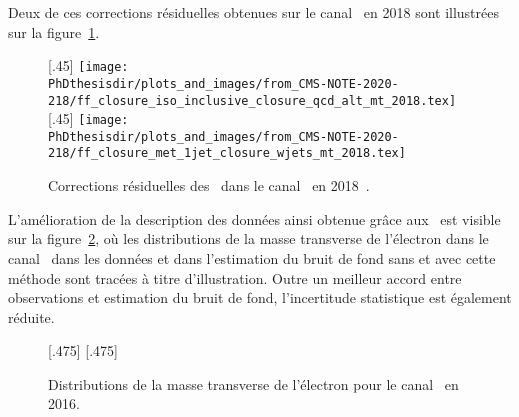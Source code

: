 Deux de ces corrections résiduelles obtenues sur le canal \mu\tauh\ en 2018 sont illustrées sur la figure~\ref{fig-chapter-HTT_analysis-section-bg_estimation-FF_method-closure}.
\begin{figure}[h]
\centering

[.45\textwidth]
{\texttt{[image: \\PhDthesisdir/plots\_and\_images/from\_CMS-NOTE-2020-218/ff\_closure\_iso\_inclusive\_closure\_qcd\_alt\_mt\_2018.tex]}}
\hfill
{}[.45\textwidth]
{\texttt{[image: \\PhDthesisdir/plots\_and\_images/from\_CMS-NOTE-2020-218/ff\_closure\_met\_1jet\_closure\_wjets\_mt\_2018.tex]}}

\caption[Corrections résiduelles des \fakefactors\ dans le canal \mu\tauh\ en 2018.]{Corrections résiduelles des \fakefactors\ dans le canal \mu\tauh\ en 2018~\cite{CMS-NOTE-2020-218}.}
\label{fig-chapter-HTT_analysis-section-bg_estimation-FF_method-closure}
\end{figure}
\par
L'amélioration de la description des données ainsi obtenue grâce aux \fakefactors\ est visible sur la figure~\ref{fig-chapter-HTT_analysis-section-bg_estimation-FF_method-2016et_mT1_illustration}, où les distributions de la masse transverse de l'électron dans le canal \ele\tauh\ dans les données et dans l'estimation du bruit de fond sans et avec cette méthode sont tracées à titre d'illustration.
Outre un meilleur accord entre observations et estimation du bruit de fond, l'incertitude statistique est également réduite.
\begin{figure}[h]
\centering

[.475\textwidth]
{}
\hfill
{}[.475\textwidth]
{}

\caption{Distributions de la masse transverse de l'électron pour le canal \ele\tauh\ en 2016.}
\label{fig-chapter-HTT_analysis-section-bg_estimation-FF_method-2016et_mT1_illustration}
\end{figure}